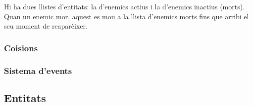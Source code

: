 Hi ha dues llistes d'entitats:
la d'enemics actius i la d'enemics inactius (morts).
Quan un enemic mor, aquest es mou a la llista d'enemics morts
fins que arribi el seu moment de reapar\`eixer.

\subsubsection{Co\lgem isions}

\subsubsection{Sistema d'events}




\subsection{Entitats}
